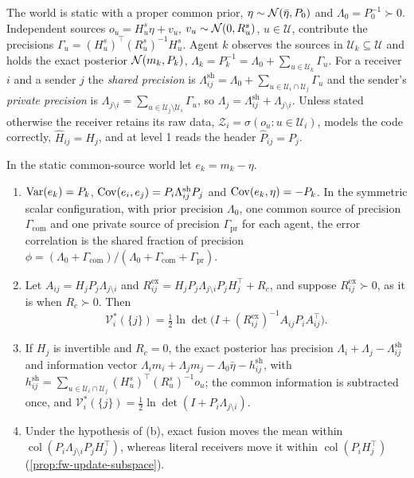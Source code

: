 \begin{definition}\label{def:mis-common-source}
The world is static with a proper common prior, $\eta\sim\mathcal{N}(\bar\eta,P_0)$ and $\Lambda_0=P_0^{-1}\succ0$. Independent sources $o_u=H^s_u\eta+v_u$, $v_u\sim\mathcal{N}(0,R^s_u)$, $u\in\mathcal U$, contribute the precisions $\Gamma_u=(H^s_u)^\top(R^s_u)^{-1}H^s_u$. Agent $k$ observes the sources in $\mathcal U_k\subseteq\mathcal U$ and holds the exact posterior $\mathcal{N}(m_k,P_k)$, $\Lambda_k=P_k^{-1}=\Lambda_0+\sum_{u\in\mathcal U_k}\Gamma_u$. For a receiver $i$ and a sender $j$ the \emph{shared precision} is $\Lambda^{\mathrm{sh}}_{ij}=\Lambda_0+\sum_{u\in\mathcal U_i\cap\mathcal U_j}\Gamma_u$ and the sender's \emph{private precision} is $\Lambda_{j\setminus i}=\sum_{u\in\mathcal U_j\setminus\mathcal U_i}\Gamma_u$, so $\Lambda_j=\Lambda^{\mathrm{sh}}_{ij}+\Lambda_{j\setminus i}$. Unless stated otherwise the receiver retains its raw data, $\mathcal Z_i=\sigma(o_u:u\in\mathcal U_i)$, models the code correctly, $\hat H_{ij}=H_j$, and at level 1 reads the header $\hat P_{ij}=P_j$.
\end{definition}

\begin{lemma}\label{lem:mis-common-source}
In the static common-source world let $e_k=m_k-\eta$.
\begin{enumerate}
\item[(a)] $\operatorname{Var}(e_k)=P_k$, $\operatorname{Cov}(e_i,e_j)=P_i\Lambda^{\mathrm{sh}}_{ij}P_j$ and $\operatorname{Cov}(e_k,\eta)=-P_k$. In the symmetric scalar configuration, with prior precision $\Lambda_0$, one common source of precision $\Gamma_{\mathrm{com}}$ and one private source of precision $\Gamma_{\mathrm{pr}}$ for each agent, the error correlation is the shared fraction of precision $\phi=(\Lambda_0+\Gamma_{\mathrm{com}})/(\Lambda_0+\Gamma_{\mathrm{com}}+\Gamma_{\mathrm{pr}})$.
\item[(b)] Let $A_{ij}=H_jP_j\Lambda_{j\setminus i}$ and $R^{\mathrm{ex}}_{ij}=H_jP_j\Lambda_{j\setminus i}P_jH_j^\top+R_c$, and suppose $R^{\mathrm{ex}}_{ij}\succ0$, as it is when $R_c\succ0$. Then
\begin{equation}\label{eq:mis-true-value}
\mathcal V^\ast_i(\{j\})=\tfrac12\ln\det\bigl(I+(R^{\mathrm{ex}}_{ij})^{-1}A_{ij}P_iA_{ij}^\top\bigr).
\end{equation}
\item[(c)] If $H_j$ is invertible and $R_c=0$, the exact posterior has precision $\Lambda_i+\Lambda_j-\Lambda^{\mathrm{sh}}_{ij}$ and information vector $\Lambda_im_i+\Lambda_jm_j-\Lambda_0\bar\eta-h^{\mathrm{sh}}_{ij}$, with $h^{\mathrm{sh}}_{ij}=\sum_{u\in\mathcal U_i\cap\mathcal U_j}(H^s_u)^\top(R^s_u)^{-1}o_u$; the common information is subtracted once, and $\mathcal V^\ast_i(\{j\})=\tfrac12\ln\det(I+P_i\Lambda_{j\setminus i})$.
\item[(d)] Under the hypothesis of (b), exact fusion moves the mean within $\operatorname{col}(P_i\Lambda_{j\setminus i}P_jH_j^\top)$, whereas literal receivers move it within $\operatorname{col}(P_iH_j^\top)$ (\cref{prop:fw-update-subspace}).
\end{enumerate}
\end{lemma}

